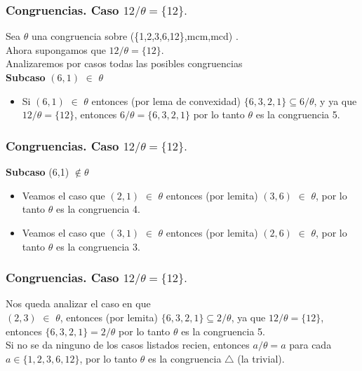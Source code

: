 \documentclass{beamer}
\begin{document}
\begin{frame}
\frametitle{Congruencias. Caso $12/\theta=\{12\}.$}
Sea $\theta$ una congruencia sobre (\{1,2,3,6,12\},mcm,mcd) .\\

\noindent Ahora supongamos que $12/\theta=\{12\}.$\\
Analizaremos por casos todas las posibles congruencias\\
\textbf{Subcaso }$(6,1)$ $\in$ $\theta$ \\
\begin{itemize}
	\item     Si $(6,1)$ $\in$ $\theta$ entonces (por lema de convexidad)
    $\{6,3,2,1\} \subseteq 6/\theta$, y ya que $12/\theta=\{12\}$, entonces $6/\theta = \{6,3,2,1\}$ por lo tanto $\theta$ es la congruencia 5.\\
\end{itemize}
\end{frame}

\begin{frame}
\frametitle{Congruencias. Caso $12/\theta=\{12\}.$}
\textbf{Subcaso} (6,1) $\not \in \theta$
\begin{itemize}
\item Veamos el caso que $(2,1)$ $\in$ $\theta$ entonces (por lemita) $(3,6)$ $\in$
    $\theta$, por lo tanto $\theta$ es la congruencia 4.\\

\item Veamos el caso que $(3,1)$ $\in$ $\theta$ entonces (por lemita) $(2,6)$ $\in$
    $\theta$, por lo tanto $\theta$ es la congruencia 3.\\  

\end{itemize}
    
\end{frame}

\begin{frame}
\frametitle{Congruencias. Caso $12/\theta=\{12\}.$}
Nos queda analizar el caso en que\\
    $(2,3)$ $\in$ $\theta$, entonces (por lemita) $\{6,3,2,1\} \subseteq 2/\theta$, ya que $12/\theta=\{12\}$, entonces $\{6,3,2,1\} = 2/\theta$ por lo tanto $\theta$ es la congruencia 5.\\
    Si no se da ninguno de los casos listados recien, entonces $a/\theta={a}$ para cada $a \in
    \{1,2,3,6,12\}$, por lo tanto $\theta$ es la congruencia $\bigtriangleup$ (la trivial).\\


\end{frame}
\end{document}
